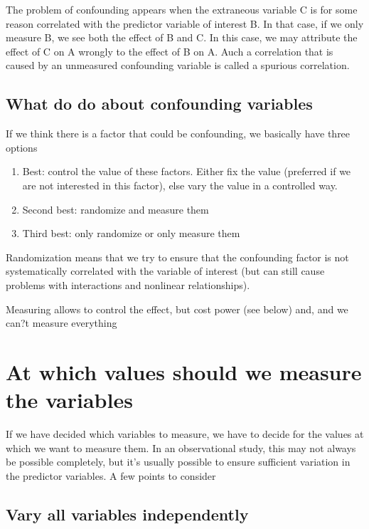 \documentclass[a4paper,twoside]{tufte-book} %
\begin{document}
The problem of confounding appears when the extraneous variable C is for some reason correlated with the predictor variable of interest B.  In that case, if we only measure B, we see both the effect of B and C. In this case, we may attribute the effect of C on A wrongly to the effect of B on A.  Auch a correlation that is caused by an unmeasured confounding variable is called a spurious correlation.  

\subsection{What do do about confounding variables}

If we think there is a factor that could be confounding, we basically have three options

\begin{enumerate}
\item Best: control the value of these factors. Either fix the value (preferred if we are not interested in this factor), else vary the value in a controlled way.
\item Second best: randomize and measure them
\item Third best: only randomize or only measure them
\end{enumerate}

Randomization means that we try to ensure that the confounding factor is not systematically correlated with the variable of interest (but can still cause problems with interactions and nonlinear relationships).

Measuring allows to control the effect, but cost power (see below) and, and we can?t measure everything

\section{At which values should we measure the variables}

If we have decided which variables to measure, we have to decide for the values at which we want to measure them. In an observational study, this may not always be possible completely, but it's usually possible to ensure sufficient variation in the predictor variables. A few points to consider

\subsection{Vary all variables independently}
\end{document}
